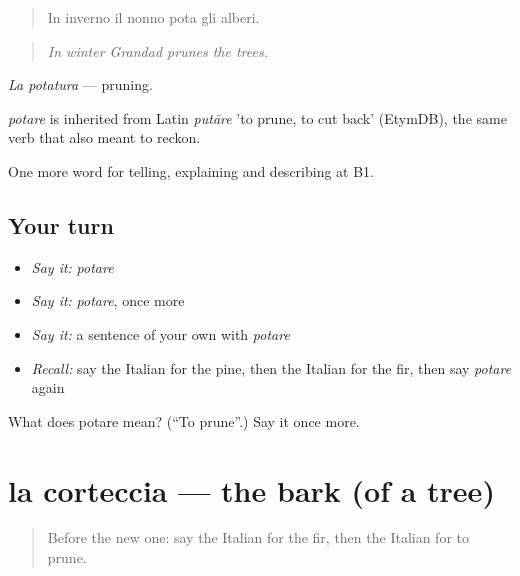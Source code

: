\begin{quote}
In inverno il nonno pota gli alberi.
\end{quote}

\begin{quote}
\emph{In winter Grandad prunes the trees.}
\end{quote}

\emph{La potatura} — pruning.

\begin{cousinweb}
\emph{potare} is inherited from Latin \emph{putāre} 'to prune, to cut back' (EtymDB), the same verb that also meant to reckon.
\end{cousinweb}

\begin{grammarlens}[title={What you've built}]
One more word for telling, explaining and describing at B1.
\end{grammarlens}

\subsection*{Your turn}
\begin{itemize}
\raggedright
  \item \emph{Say it:} \emph{potare}
  \item \emph{Say it:} \emph{potare}, once more
  \item \emph{Say it:} a sentence of your own with \emph{potare}
  \item \emph{Recall:} say the Italian for the pine, then the Italian for the fir, then say \emph{potare} again
\end{itemize}

\begin{tcolorbox}[breakable,colback=teal!4,colframe=teal!35!black,title={Before you move on}]
What does potare mean? (\textquotedblleft{}To prune\textquotedblright{}.) Say it once more.
\end{tcolorbox}
\section[la corteccia]{la corteccia — the bark (of a tree)}

\label{lesson:IT-C461-corteccia}



\begin{quote}
Before the new one: say the Italian for the fir, then the Italian for to prune.
\end{quote}

